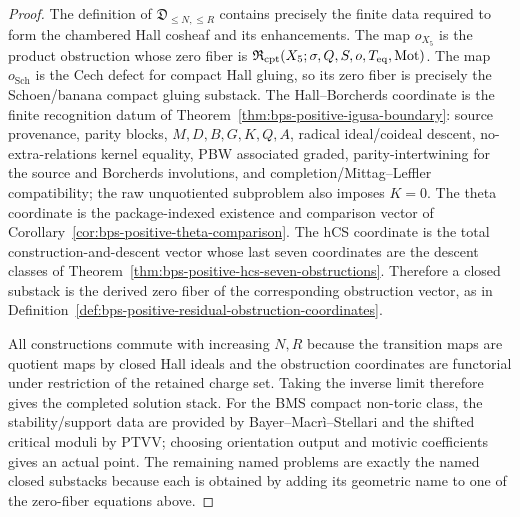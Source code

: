 \begin{proof}
The definition of \(\mathfrak D_{\leq N,\leq R}\) contains precisely the
finite data required to form the chambered Hall cosheaf and its
enhancements. The map \(o_{X_5}\) is the product obstruction whose zero
fiber is
\(\mathfrak R_{\mathrm{cpt}}(X_5;\sigma,Q,S,o,T_{\mathrm{eq}},\mathrm{Mot})\).
The map \(o_{\mathrm{Sch}}\) is the Cech defect for compact Hall
gluing, so its zero fiber is precisely the Schoen/banana compact
gluing substack. The Hall--Borcherds coordinate is the finite
recognition datum of Theorem~\ref{thm:bps-positive-igusa-boundary}:
source provenance, parity blocks, \(M,D,B,G,K,Q,A\), radical
ideal/coideal descent, no-extra-relations kernel equality, PBW
associated graded, parity-intertwining for the source and Borcherds
involutions, and completion/Mittag--Leffler compatibility; the
raw unquotiented subproblem also imposes \(K=0\). The theta coordinate is
the package-indexed existence and comparison vector of
Corollary~\ref{cor:bps-positive-theta-comparison}. The hCS coordinate
is the total construction-and-descent vector whose last seven
coordinates are the descent classes of
Theorem~\ref{thm:bps-positive-hcs-seven-obstructions}. Therefore a
closed substack is the derived zero fiber of the corresponding
obstruction vector, as in
Definition~\ref{def:bps-positive-residual-obstruction-coordinates}.

All constructions commute with increasing \(N,R\) because the transition
maps are quotient maps by closed Hall ideals and the obstruction
coordinates are functorial under restriction of the retained charge set.
Taking the inverse limit therefore gives the completed solution stack.
For the BMS compact non-toric class, the stability/support data are
provided by Bayer--Macr\`i--Stellari and the shifted critical moduli by
PTVV; choosing orientation output and motivic coefficients gives an
actual point. The remaining named problems are exactly the named closed
substacks because each is obtained by adding its geometric name to one
of the zero-fiber equations above.
\end{proof}
